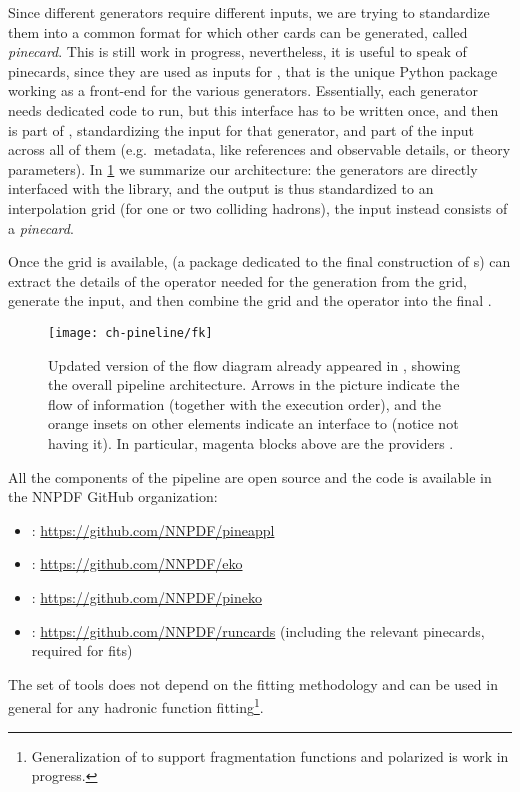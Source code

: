 Since different generators require different inputs, we are trying to
standardize them into a common format for which other cards can be generated,
called \textit{pinecard}.
This is still work in progress, nevertheless, it is useful to speak of
pinecards, since they are used as inputs for \pinefarm, that is the unique
Python package working as a front-end for the various generators.
Essentially, each generator needs dedicated code to run, but this interface has
to be written once, and then is part of \pinefarm, standardizing the input for
that generator, and part of the input across all of them (e.g.\ metadata, like
references and observable details, or theory parameters).
In \cref{fig:pine/pineline} we summarize our architecture: the generators are
directly interfaced with the \pineappl library, and the output is thus
standardized to an interpolation grid (for one or two colliding hadrons), the
input instead consists of a \textit{pinecard}.

Once the grid is available, \pineko (a package dedicated to the final
construction of \fktab{}s) can extract the details of the operator needed for
the \fktab generation from the grid, generate the \eko input, and then combine
the grid and the operator into the final \fktab.

\begin{figure}
  \centering
  \texttt{[image: ch-pineline/fk]}
  \caption{
    Updated version of the flow diagram already appeared in
    \cite{Amoroso:2022eow}, showing the overall pipeline architecture.
    Arrows in the picture indicate the flow of information (together with the
    execution order), and the orange insets on other elements indicate an
    interface to \pineappl (notice \eko not having it).
    In particular, magenta blocks above \pinefarm are the providers
    \cite{Grazzini:2017mhc,Frederix:2018nkq,Carli:2010rw,candido_alessandro_2022_6285149,Britzger:2012bs,Anastasiou:2003ds}.
  }
  \label{fig:pine/pineline}
  \vspace*{-5pt}
\end{figure}

All the components of the pipeline are open source and the code is available in
the NNPDF GitHub organization:
\begin{itemize}
  \setlength\itemsep{2pt}
  \item \pineappl: \url{https://github.com/NNPDF/pineappl}
  \item \eko: \url{https://github.com/NNPDF/eko}
  \item \pineko: \url{https://github.com/NNPDF/pineko}
  \item \pinefarm: \url{https://github.com/NNPDF/runcards} (including the
    relevant pinecards, required for \nnpdf fits)
\end{itemize}

The set of tools does not depend
on the \nnpdf fitting methodology and can be used in general for
any hadronic function fitting\footnote{
  Generalization of \pineappl to support fragmentation functions and polarized
  \pdfs is work in progress.
}.

